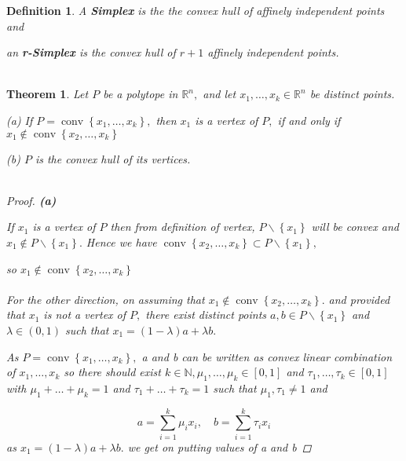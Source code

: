 \documentclass[oneside]{book}
\newtheorem{theorem}{Theorem}[section]
\newtheorem{mydef}{Definition}
\begin{document}
 



 

 
 
 
 
 
 




\begin{mydef}    
 A \textbf{Simplex} is the the convex hull of affinely independent points and \par 
  an \textbf{r-Simplex} is the convex hull of $r+ 1$ affinely independent points.
  \\\\
  \end{mydef} 


\begin{theorem}

Let $P$ be a polytope in $\mathbb{R}^{n},$ and let $x_{1}, \ldots, x_{k} \in \mathbb{R}^{n}$ be distinct points.\par
(a) If $P=\operatorname{conv}\left\{x_{1}, \ldots, x_{k}\right\},$ then $x_{1}$ is a vertex of $P,$ if and only if $x_{1} \notin \operatorname{conv}\left\{x_{2}, \ldots, x_{k}\right\}$ \par
(b) $P$ is the convex hull of its vertices. \\\\

\begin{proof}

\textbf{(a)}  \par 


 If  $x_{1}$ is a vertex of $P $ then  from definition of vertex, $P \backslash\left\{x_{1}\right\}$ will be convex and $x_{1} \notin P \backslash\left\{x_{1}\right\} .$ Hence we have  $\operatorname{conv}\left\{x_{2}, \ldots, x_{k}\right\} \subset P \backslash\left\{x_{1}\right\},$ 
 \par 
 so  $x_{1} \notin \operatorname{conv}\left\{x_{2}, \ldots, x_{k}\right\}$ \\\\
For the other direction, on assuming that $x_{1} \notin \operatorname{conv}\left\{x_{2}, \ldots, x_{k}\right\} .$ and provided that  $x_{1}$ is not a vertex of $P,$ there exist distinct points $a, b \in P \backslash\left\{x_{1}\right\}$ and $\lambda \in(0,1)$ such that $x_{1}=(1-\lambda) a+\lambda b .$ 

As  $P=\operatorname{conv}\left\{x_{1}, \ldots, x_{k}\right\},$ a and b can be written as convex linear combination of $x_{1},\ldots ,x_{k} $   so there should exist $k \in \mathbb{N}, \mu_{1}, \ldots, \mu_{k} \in[0,1]$ and $\tau_{1}, \ldots, \tau_{k} \in[0,1]$ with $\mu_{1}+\ldots+\mu_{k}=1$ and $\tau_{1}+\ldots+\tau_{k}=1$
such that $\mu_{1}, \tau_{1} \neq 1$ and \par
\begin{equation}
a=\sum_{i=1}^{k} \mu_{i} x_{i}, \quad b=\sum_{i=1}^{k} \tau_{i} x_{i}
\end{equation}  
as $x_{1}=(1-\lambda) a+\lambda b .$ we get on putting values of a and b 


\end{proof}
\end{theorem}
\end{document}
